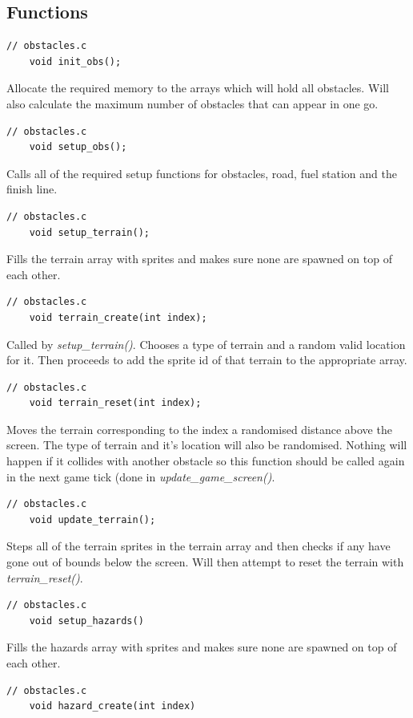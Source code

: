 \documentclass{article}
\begin{document}
\subsection*{Functions}
\begin{lstlisting}[style=CStyle]
	// obstacles.c
	void init_obs();	
\end{lstlisting}
Allocate the required memory to the arrays which will hold all obstacles. Will also calculate the maximum number of obstacles that can appear in one go.
\begin{lstlisting}[style=CStyle]
	// obstacles.c
	void setup_obs();
\end{lstlisting}
Calls all of the required setup functions for obstacles, road, fuel station and the finish line.
\begin{lstlisting}[style=CStyle]
	// obstacles.c
	void setup_terrain();
\end{lstlisting}
Fills the terrain array with sprites and makes sure none are spawned on top of each other.
\begin{lstlisting}[style=CStyle]
	// obstacles.c
	void terrain_create(int index);
\end{lstlisting}
Called by \emph{setup\_terrain()}. Chooses a type of terrain and a random valid location for it. Then proceeds to add the sprite id of that terrain to the appropriate array.
\begin{lstlisting}[style=CStyle]
	// obstacles.c
	void terrain_reset(int index);
\end{lstlisting}
Moves the terrain corresponding to the index a randomised distance above the screen. The type of terrain and it's location will also be randomised. Nothing will happen if it collides with another obstacle so this function should be called again in the next game tick (done in \emph{update\_game\_screen()}.
\begin{lstlisting}[style=CStyle]
	// obstacles.c
	void update_terrain();
\end{lstlisting}
Steps all of the terrain sprites in the terrain array and then checks if any have gone out of bounds below the screen. Will then attempt to reset the terrain with \emph{terrain\_reset()}.
\begin{lstlisting}[style=CStyle]
	// obstacles.c
	void setup_hazards() 
\end{lstlisting}
Fills the hazards array with sprites and makes sure none are spawned on top of each other.
\begin{lstlisting}[style=CStyle]
	// obstacles.c
	void hazard_create(int index)
\end{lstlisting}
\end{document}
